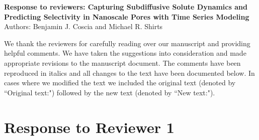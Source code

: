 \documentclass{article}
\begin{document}
\graphicspath{{./figures/}}

\begin{center}
\textbf{Response to reviewers: Capturing Subdiffusive Solute Dynamics and Predicting
Selectivity in Nanoscale Pores with Time Series Modeling} \\
Authors: Benjamin J. Coscia and Michael R. Shirts
\end{center}

We thank the reviewers for carefully reading over our manuscript and providing
helpful comments. We have taken the suggestions into consideration and made
appropriate revisions to the manuscript document. The comments have been reproduced
in italics and all changes to the text have been documented below. 
In cases where we modified the text we included the original text (denoted by ``Original text:") 
followed by the new text (denoted by ``New text:").

\section*{Response to Reviewer 1}
\end{document}
